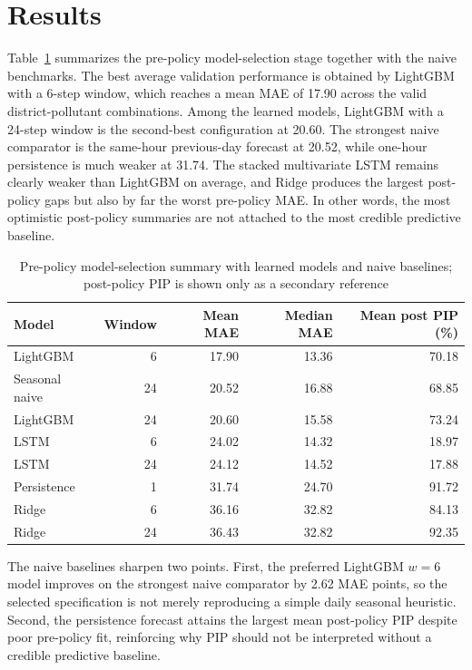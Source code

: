 \section{Results}\label{sec:results}

Table~\ref{tab:model_selection} summarizes the pre-policy model-selection stage together with the naive benchmarks. The best average validation performance is obtained by LightGBM with a 6-step window, which reaches a mean MAE of 17.90 across the valid district-pollutant combinations. Among the learned models, LightGBM with a 24-step window is the second-best configuration at 20.60. The strongest naive comparator is the same-hour previous-day forecast at 20.52, while one-hour persistence is much weaker at 31.74. The stacked multivariate LSTM remains clearly weaker than LightGBM on average, and Ridge produces the largest post-policy gaps but also by far the worst pre-policy MAE. In other words, the most optimistic post-policy summaries are not attached to the most credible predictive baseline.

\begin{table}[htbp]
\centering
\caption{Pre-policy model-selection summary with learned models and naive baselines; post-policy PIP is shown only as a secondary reference}
\label{tab:model_selection}
\begin{tabular}{@{}lrrrr@{}}
\toprule
Model & Window & Mean MAE & Median MAE & Mean post PIP (\%) \\
\midrule
LightGBM & 6  & 17.90 & 13.36 & 70.18 \\
Seasonal naive & 24 & 20.52 & 16.88 & 68.85 \\
LightGBM & 24 & 20.60 & 15.58 & 73.24 \\
LSTM     & 6  & 24.02 & 14.32 & 18.97 \\
LSTM     & 24 & 24.12 & 14.52 & 17.88 \\
Persistence & 1  & 31.74 & 24.70 & 91.72 \\
Ridge    & 6  & 36.16 & 32.82 & 84.13 \\
Ridge    & 24 & 36.43 & 32.82 & 92.35 \\
\bottomrule
\end{tabular}
\end{table}

The naive baselines sharpen two points. First, the preferred LightGBM $w=6$ model improves on the strongest naive comparator by 2.62 MAE points, so the selected specification is not merely reproducing a simple daily seasonal heuristic. Second, the persistence forecast attains the largest mean post-policy PIP despite poor pre-policy fit, reinforcing why PIP should not be interpreted without a credible predictive baseline.

